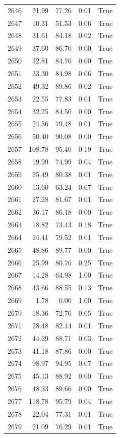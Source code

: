 \begin{longtable}{rrrrr}
2646 & 21.99 & 77.26 & 0.01 & True \\
2647 & 10.31 & 51.53 & 0.06 & True \\
2648 & 31.61 & 84.18 & 0.02 & True \\
2649 & 37.60 & 86.70 & 0.00 & True \\
2650 & 32.81 & 84.76 & 0.00 & True \\
2651 & 33.30 & 84.98 & 0.06 & True \\
2652 & 49.32 & 89.86 & 0.02 & True \\
2653 & 22.55 & 77.83 & 0.01 & True \\
2654 & 32.25 & 84.50 & 0.00 & True \\
2655 & 24.36 & 79.48 & 0.01 & True \\
2656 & 50.40 & 90.08 & 0.00 & True \\
2657 & 108.78 & 95.40 & 0.19 & True \\
2658 & 19.99 & 74.99 & 0.04 & True \\
2659 & 25.49 & 80.38 & 0.01 & True \\
2660 & 13.60 & 63.24 & 0.67 & True \\
2661 & 27.28 & 81.67 & 0.01 & True \\
2662 & 36.17 & 86.18 & 0.00 & True \\
2663 & 18.82 & 73.43 & 0.18 & True \\
2664 & 24.41 & 79.52 & 0.01 & True \\
2665 & 48.86 & 89.77 & 0.00 & True \\
2666 & 25.99 & 80.76 & 0.25 & True \\
2667 & 14.28 & 64.98 & 1.00 & True \\
2668 & 43.66 & 88.55 & 0.13 & True \\
2669 & 1.78 & 0.00 & 1.00 & True \\
2670 & 18.36 & 72.76 & 0.05 & True \\
2671 & 28.48 & 82.44 & 0.01 & True \\
2672 & 44.29 & 88.71 & 0.03 & True \\
2673 & 41.18 & 87.86 & 0.00 & True \\
2674 & 98.97 & 94.95 & 0.07 & True \\
2675 & 45.13 & 88.92 & 0.00 & True \\
2676 & 48.33 & 89.66 & 0.00 & True \\
2677 & 118.78 & 95.79 & 0.04 & True \\
2678 & 22.04 & 77.31 & 0.01 & True \\
2679 & 21.09 & 76.29 & 0.01 & True \\

\end{longtable}
